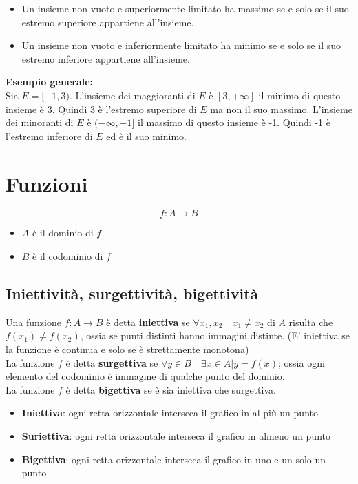 \documentclass[12pt, a4paper]{report}
\begin{document}
    \begin{itemize}
        \item Un insieme non vuoto e superiormente limitato ha massimo se e solo se il suo estremo superiore appartiene all'insieme.
        \item Un insieme non vuoto e inferiormente limitato ha minimo se e solo se il suo estremo inferiore appartiene all'insieme.
    \end{itemize}
    \textbf{Esempio generale:}\\
    Sia $E=[-1,3)$. L'insieme dei maggioranti di $E$ è $[3,+\infty]$ il minimo di questo insieme è 3. Quindi 3 è l'estremo superiore di $E$ ma non il suo massimo. L'insieme dei minoranti di $E$ è $(-\infty,-1]$ il massimo di questo insieme è -1. Quindi -1 è l'estremo inferiore di $E$ ed è il suo minimo.
    \chapter{Funzioni}
    \begin{equation*}
        f: A \rightarrow B
    \end{equation*}
    \begin{itemize}
        \item $A$ è il dominio di $f$
        \item $B$ è il codominio di $f$
    \end{itemize}
    \section{Iniettività, surgettività, bigettività}
    Una funzione $f: A \rightarrow B$ è detta \textbf{iniettiva} se $\forall x_{1},x_{2} \quad x_{1}\neq x_{2}$ di $A$ risulta che $f(x_{1})\neq f(x_{2})$, ossia se punti distinti hanno immagini distinte. (E' iniettiva se la funzione è continua e solo se è strettamente monotona)\\
    La funzione $f$ è detta \textbf{surgettiva} se $\forall y \in B \quad \exists x \in A | y=f(x)$; ossia ogni elemento del codominio è immagine di qualche punto del dominio.\\
    La funzione $f$ è detta \textbf{bigettiva} se è sia iniettiva che surgettiva.
    \begin{itemize}
        \item \textbf{Iniettiva}: ogni retta orizzontale interseca il grafico in al più un punto
        \item \textbf{Suriettiva}: ogni retta orizzontale interseca il grafico in almeno un punto
        \item \textbf{Bigettiva}: ogni retta orizzontale interseca il grafico in uno e un solo un punto
    \end{itemize}
\end{document}
